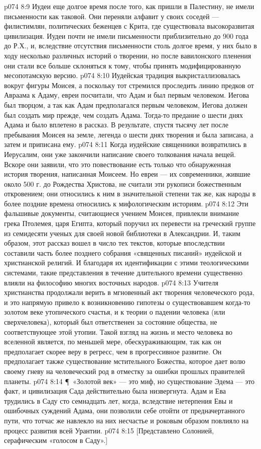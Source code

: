 \vs p074 8:9 Иудеи еще долгое время после того, как пришли в Палестину, не имели письменности как таковой. Они переняли алфавит у своих соседей --- филистимлян, политических беженцев с Крита, где существовала высокоразвитая цивилизация. Иудеи почти не имели письменности приблизительно до 900 года до Р.Х., и, вследствие отсутствия письменности столь долгое время, у них было в ходу несколько различных историй о творении, но после вавилонского пленения они стали все больше склоняться к тому, чтобы принять модифицированную месопотамскую версию.
\vs p074 8:10 Иудейская традиция выкристаллизовалась вокруг фигуры Моисея, а поскольку тот стремился проследить линию предков от Авраама к Адаму, евреи посчитали, что Адам и был первым человеком. Иегова был творцом, а так как Адам предполагался первым человеком, Иегова должен был создать мир прежде, чем создать Адама. Тогда\hyp{}то предание о шести днях Адама и было вплетено в рассказ. В результате, спустя тысячу лет после пребывания Моисея на земле, легенда о шести днях творения и была записана, а затем и приписана ему.
\vs p074 8:11 Когда иудейские священники возвратились в Иерусалим, они уже закончили написание своего толкования начала вещей. Вскоре они заявили, что это повествование есть только что обнаруженная история творения, написанная Моисеем. Но евреи --- их современники, жившие около 500 г. до Рождества Христова, не считали эти рукописи божественным откровением; они относились к ним в значительной степени так же, как народы в более поздние времена относились к мифологическим историям.
\vs p074 8:12 Эти фальшивые документы, считающиеся учением Моисея, привлекли внимание грека Птолемея, царя Египта, который поручил их перевести на греческий группе из семидесяти ученых для своей новой библиотеки в Александрии. И, таким образом, этот рассказ вошел в число тех текстов, которые впоследствии составили часть более позднего собрания «священных писаний» иудейской и христианской религий. И благодаря их идентификации с этими теологическими системами, такие представления в течение длительного времени существенно влияли на философию многих восточных народов.
\vs p074 8:13 Учителя христианства продолжали верить в мгновенный акт творения человеческого рода, и это напрямую привело к возникновению гипотезы о существовавшем когда\hyp{}то золотом веке утопического счастья, и к теории о падении человека (или сверхчеловека), который был ответственен за состояние общества, не соответствующее этой утопии. Такой взгляд на жизнь и место человека во вселенной является, по меньшей мере, обескураживающим, так как он предполагает скорее веру в регресс, чем в прогрессивное развитие. Он предполагает также существование мстительного Божества, которое дает волю своему гневу на человеческий род в отместку за ошибки прошлых правителей планеты.
\vs p074 8:14 \P\ «Золотой век» --- это миф, но существование Эдема --- это факт, и цивилизация Сада действительно была низвергнута. Адам и Ева трудились в Саду сто семнадцать лет, когда, вследствие нетерпения Евы и ошибочных суждений Адама, они позволили себе отойти от предначертанного пути, что тотчас же навлекло на них несчастье и роковым образом повлияло на процесс развития всей Урантии.
\vs p074 8:15 [Представлено Солонией, серафическим «голосом в Саду».]
